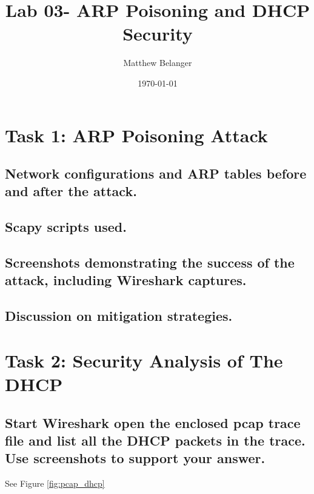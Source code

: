 \documentclass{article}
\title{Lab 03- ARP Poisoning and DHCP Security}
\author{Matthew Belanger}
\date{\today}
\begin{document}
\maketitle

\newpage



\section{Task 1: ARP Poisoning Attack}

\subsection{Network configurations and ARP tables before and after the attack.}

\subsection{Scapy scripts used.}

\subsection{Screenshots demonstrating the success of the attack, including Wireshark captures.}

\subsection{Discussion on mitigation strategies.}

\newpage


\section{Task 2: Security Analysis of The DHCP}

\subsection{Start Wireshark open the enclosed pcap trace file and list all the DHCP packets in the trace. Use
screenshots to support your answer.}

See Figure \ref{fig:pcap_dhcp}
\end{document}
